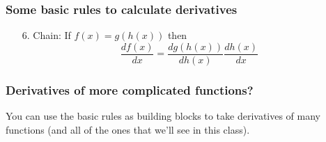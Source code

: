 \documentclass[xcolor=pdftex,dvipsnames]{beamer}
\begin{document}
\begin{frame}
\frametitle{Some basic rules to calculate derivatives}
\begin{enumerate}
\item[6.] Chain: If $f(x) = g(h(x))$ then 
\[
\frac{df(x)}{dx} = \frac{dg(h(x))}{dh(x)}\frac{dh(x)}{dx}
\]\end{enumerate}

\end{frame}


\begin{frame}
\frametitle{Derivatives of more complicated functions?}
You can use the basic rules as building blocks to take derivatives of
many functions (and all of the ones that we'll see in this class).
\end{frame}
\end{document}
